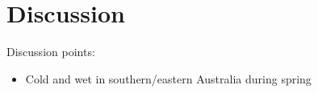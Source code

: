 \section{Discussion}

Discussion points:
\begin{itemize}
\item Cold and wet in southern/eastern Australia during spring
\end{itemize}